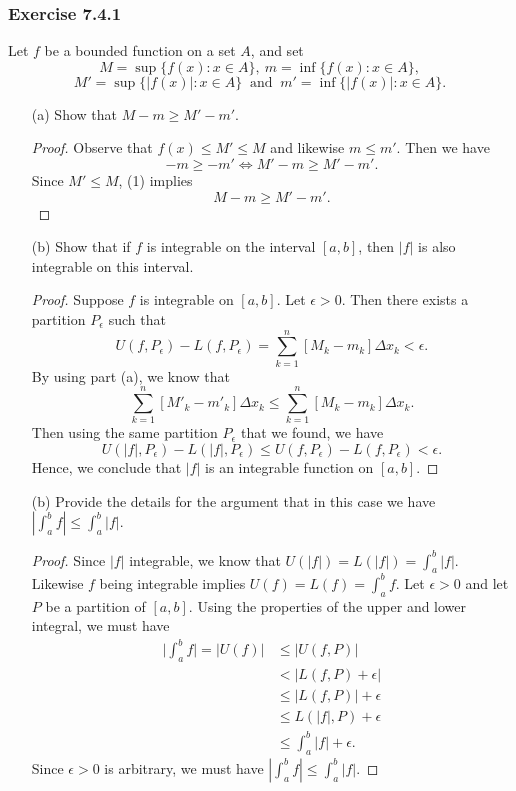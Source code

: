 \subsubsection{Exercise 7.4.1} Let \( f  \) be a bounded function on a set \( A  \), and set 
\[  M = \sup \{ f(x) : x \in A  \},  \ m = \inf \{ f(x) : x \in A \}, \]
\[  M' = \sup \{ | f(x)  | : x \in A  \} \ \text{ and } \ m' = \inf \{ | f(x)  | : x \in A \}. \]

\begin{enumerate}
    \item[(a)] Show that \( M - m \geq M' - m' \).
		\begin{proof}
		Observe that \( f(x) \leq M' \leq M \) and likewise \( m \leq m'  \). Then we have  
		\[  -m \geq -m' \iff M' - m \geq M' - m'. \tag{1}\]
		Since \( M' \leq M \), (1) implies 
		\[  M - m \geq M' - m'. \]
		\end{proof}
	\item[(b)] Show that if \( f  \) is integrable on the interval \( [a,b]  \), then \( | f |  \) is also integrable on this interval.
		\begin{proof}
			Suppose \( f \) is integrable on \( [a,b] \). Let \( \epsilon > 0  \). Then there exists a partition \(  P_{\epsilon } \) such that 
			\[  U(f,P_{\epsilon } ) - L(f, P_{\epsilon }) = \sum_{ k=1 }^{ n } [M_{k } - m_{k }] \Delta x_{k} < \epsilon. \]
			By using part (a), we know that 
			\[  \sum_{ k=1 }^{ n } [M'_{k } - m'_{k }] \Delta x_{k } \leq \sum_{ k=1 }^{ n } [ M_{k } - m_{k } ] \Delta x_{k }. \]
			Then using the same partition \( P_{\epsilon } \) that we found, we have 
			\[ U(| f | , P_{\epsilon } ) - L(| f | , P_{\epsilon } ) \leq U(f , P_{\epsilon }) - L( f  , P_{\epsilon }) < \epsilon. \] Hence, we conclude that \( | f |  \) is an integrable function on \( [a,b]  \). 
		\end{proof}
	\item[(b)] Provide the details for the argument that in this case we have \( | \int_{ a }^{ b } f  | \leq \int_{ a }^{ b } | f | \).
		\begin{proof}
			Since \( | f |  \) integrable, we know that \( U(| f | ) = L(| f | ) = \int_{ a }^{ b } | f |    \). Likewise \( f \) being integrable implies \( U( f ) = L(f) = \int_{ a }^{ b } f   \). Let \( \epsilon > 0 \) and let \( P \) be a partition of \( [a,b]  \). Using the properties of the upper and lower integral, we must have 
		\begin{align*}
		    \Big| \int_{ a }^{ b } f  \Big| = | U(f)  |   
											&\leq | U(f,P)  | \\
											&< \Big| L(f,P) + \epsilon  \Big| \\  
											&\leq | L(f,P)  | + \epsilon \\
											&\leq L(| f | , P) + \epsilon \\
											&\leq \int_{ a }^{ b } | f | + \epsilon. 
		\end{align*}
		Since \( \epsilon > 0  \) is arbitrary, we must have \( | \int_{ a }^{ b } f  |  \leq \int_{ a }^{ b } | f |   \). 
		\end{proof}
\end{enumerate}


